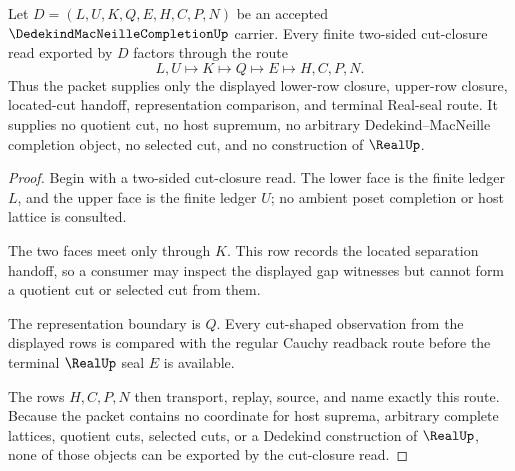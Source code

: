 \begin{theorem}
\label{thm:dedekind-macneille-completion-cut-closure}
Let $D=(L,U,K,Q,E,H,C,P,N)$ be an accepted $\DedekindMacNeilleCompletionUp$ carrier. Every finite two-sided cut-closure read exported by $D$ factors through the route
$$
L,U \longmapsto K \longmapsto Q \longmapsto E \longmapsto H,C,P,N .
$$
Thus the packet supplies only the displayed lower-row closure, upper-row closure, located-cut handoff, representation comparison, and terminal Real-seal route. It supplies no quotient cut, no host supremum, no arbitrary Dedekind--MacNeille completion object, no selected cut, and no construction of $\RealUp$.
\end{theorem}
\begin{proof}
Begin with a two-sided cut-closure read. The lower face is the finite ledger $L$, and the upper face is the finite ledger $U$; no ambient poset completion or host lattice is consulted.

The two faces meet only through $K$. This row records the located separation handoff, so a consumer may inspect the displayed gap witnesses but cannot form a quotient cut or selected cut from them.

The representation boundary is $Q$. Every cut-shaped observation from the displayed rows is compared with the regular Cauchy readback route before the terminal $\RealUp$ seal $E$ is available.

The rows $H,C,P,N$ then transport, replay, source, and name exactly this route. Because the packet contains no coordinate for host suprema, arbitrary complete lattices, quotient cuts, selected cuts, or a Dedekind construction of $\RealUp$, none of those objects can be exported by the cut-closure read.
\end{proof}

